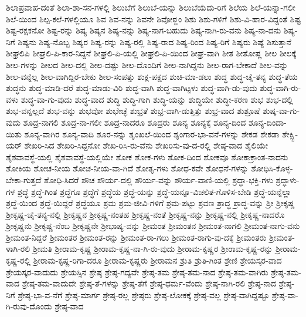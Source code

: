 {ಶಿಲಾಪ್ರವಾಹ-ದಂತೆ
ಶಿಲಾ-ಶಾ-ಸನ-ಗಳಲ್ಲಿ
ಶಿಲುಬೆಗೆ
ಶಿಲುಬೆ-ಯನ್ನು
ಶಿಲುಬೆಯೆದು-ರಿಗೆ
ಶಿಲೆಯ
ಶಿಲೆ-ಯನ್ನಾ-ಗಲೀ
ಶಿಲೆ-ಯಿಂದ
ಶಿಲ್ಪ-ಕಲೆ-ಗಳಲ್ಲಿಯೂ
ಶಿವ
ಶಿವ-ನನ್ನು
ಶಿವನೇ
ಶಿವೋಠ್ಹಂ
ಶಿಶು
ಶಿಶು-ಗಳಿಗೆ
ಶಿಶು-ವಿ-ಹಾರ-ವಿದ್ದಂತೆ
ಶಿಷ್ಟ
ಶಿಷ್ಟ-ರಕ್ಷಕನೋ
ಶಿಷ್ಟ-ರನ್ನು
ಶಿಷ್ಯ
ಶಿಷ್ಯನ
ಶಿಷ್ಯ-ನನ್ನು
ಶಿಷ್ಯ-ನಾಗ-ಬಹುದು
ಶಿಷ್ಯ-ನಾಗಿ-ರು-ವನು
ಶಿಷ್ಯ-ನಾ-ದನು
ಶಿಷ್ಯ-ನಿಗೆ
ಶಿಷ್ಯನು
ಶಿಷ್ಯ-ನೊಬ್ಬ
ಶಿಷ್ಯರ
ಶಿಷ್ಯ-ರನ್ನು
ಶಿಷ್ಯ-ರಲ್ಲಿ
ಶಿಷ್ಯ-ರಾದ
ಶಿಷ್ಯ-ರಿಂದ
ಶಿಷ್ಯ-ರಿಗೆ
ಶಿಷ್ಯರು
ಶಿಷ್ಯೆ
ಶಿಸುತ್ತಾನೆ
ಶೀಘ್ರಲಿಪಿ
ಶೀಘ್ರಲಿ-ಪಿ-ಕಾರ-ನಿದ್ದನೆ
ಶೀಘ್ರಲಿ-ಪಿ-ಯಲ್ಲಿ
ಶೀಘ್ರಲಿ-ಪಿ-ಯಿಂದ
ಶೀಘ್ರ-ವಾಗಿ
ಶೀತ
ಶೀತೋಷ್ಣ
ಶೀಲ
ಶೀಲಕ್ಕೆ
ಶೀಲ-ಗಳನ್ನು
ಶೀಲದ
ಶೀಲ-ದಲ್ಲಿ
ಶೀಲ-ದಷ್ಟು
ಶೀಲ-ದೊಂದಿಗೆ
ಶೀಲ-ನಾಗಿದ್ದನು
ಶೀಲ-ರಾಗ-ಬೇಕಾದೆ
ಶೀಲ-ವನ್ನು
ಶೀಲ-ವನ್ನೆಲ್ಲ
ಶೀಲ-ವಾಗಿದ್ದಿರ-ಬೇಕು
ಶೀಲ-ಸಂಪತ್ತು
ಶುಕ್ಲ-ಪಕ್ಷದ
ಶುಚಿ-ಮಾ-ಡಲು
ಶುದ್ಧ
ಶುದ್ಧ-ಚೈ-ತನ್ಯ
ಶುದ್ಧ-ತೆಯ
ಶುದ್ಧನು
ಶುದ್ಧ-ಮಾಡಿ-ದರೆ
ಶುದ್ಧ-ಮಾಡು-ವಿರಿ
ಶುದ್ಧ-ವಾಗಿ
ಶುದ್ಧ-ವಾಗಿಟ್ಟಳು
ಶುದ್ಧ-ವಾಗಿ-ಡು-ವುದು
ಶುದ್ಧ-ವಾಗಿ-ರು-ವಳು
ಶುದ್ಧ-ವಾ-ಗು-ವುದು
ಶುದ್ಧ-ವಾದ
ಶುದ್ಧಿ
ಶುದ್ಧಿ-ಗಾಗಿ
ಶುದ್ಧಿ-ಯನ್ನು
ಶುದ್ಧಿಯೇ
ಶುದ್ಧೀ-ಕರಣ
ಶುಭ
ಶುಭ-ದಲ್ಲಿ
ಶುಭ-ವನ್ನಲ್ಲದೆ
ಶುಭ-ವನ್ನು
ಶುಭವೋ
ಶುಭೇಚ್ಛೆ
ಶುಭ್ರತೆ
ಶುಭ್ರ-ವಾಗಿ-ಡುತ್ತಿತ್ತು
ಶುಭ್ರ-ವಾದ
ಶುಶ್ರೂಷೆ
ಶುಷ್ಕ-ವಾ-ಗು-ವುದು
ಶೂದ್ರ-ನಾಗಲಿ
ಶೂದ್ರ-ನಾ-ಗಲೀ
ಶೂದ್ರ-ನಾದರೂ
ಶೂದ್ರರು
ಶೂನ್ಯ
ಶೂನ್ಯಕ್ಕೆ
ಶೂನ್ಯ-ದಿಂದ
ಶೂನ್ಯ-ದಿಂದಾ-ಯಿತು
ಶೂನ್ಯ-ವಾಗಿರ
ಶೂನ್ಯ-ವಾದಿ
ಶೂರ-ನನ್ನು
ಶೃಂಖಲೆ-ಯಿಂದ
ಶೃಂಗಾರ-ಭಾ-ವನೆ-ಗಳನ್ನು
ಶೇಕಡ
ಶೇಕಡಾ
ಶೇಕ್ಸ್ಪಿ-ಯರ್
ಶೇಖರಿ-ಸಿದ
ಶೇಖರಿ-ಸಿದ್ದನೋ
ಶೇಖ-ರಿಸಿ-ರು-ವೆನು
ಶೇಖರಿಸು-ವು-ದ-ರಲ್ಲಿ
ಶೇಷ್ಠ-ವಾದ
ಶೈಲಿಯೇ
ಶೈಶವಾವಸ್ಥೆ-ಯಲ್ಲಿ
ಶೈಶವಾವಸ್ಥೆ-ಯಲ್ಲಿಯೇ
ಶೋಕ
ಶೋಕ-ಗಳು
ಶೋಕ-ದಿಂದ
ಶೋಕವೂ
ಶೋಕಾಕ್ರಾಂತ-ನಾದನು
ಶೋಕಿಯ
ಶೋಚ-ನೀಯ
ಶೋಚ-ನೀಯ-ವಾ-ಗಿದೆ
ಶೋತೃ-ಗಳು
ಶೋಧ-ಕವೇ
ಶೋಧನೆ-ಗಳನ್ನು
ಶೋಧಿಸಿ-ಕೊಳ್ಳ-ಬೇಕಾ-ಗುತ್ತದೆ
ಶೋಧಿ-ಸಿದರೆ
ಶೌಚ
ಶೌರ್ಯ-ದಲ್ಲಿ
ಶೌರ್ಯ-ವನ್ನು
ಶೌರ್ಯ-ವಾಣಿ-ಯಲ್ಲಿ
ಶ್ರದ್ಧಾ-ಭಕ್ತಿ-ಗಳು
ಶ್ರದ್ಧಾಳು-ಗಳ
ಶ್ರದ್ಧೆ
ಶ್ರದ್ಧೆ-ಗಿಂತ
ಶ್ರದ್ಧೆಗೂ
ಶ್ರದ್ಧೆಗೆ
ಶ್ರದ್ಧೆಯ
ಶ್ರದ್ಧೆ-ಯನ್ನು
ಶ್ರದ್ಧೆ-ಯನ್ನೂ-ವಿಚಲಿತ-ಗೊಳಿಸ-ಬೇಡಿ
ಶ್ರದ್ಧೆ-ಯನ್ನೆಲ್ಲಾ
ಶ್ರದ್ಧೆ-ಯಿಂದ
ಶ್ರದ್ಧೆ-ಯಿದ್ದರೆ
ಶ್ರದ್ಧೆಯೂ
ಶ್ರಮ
ಶ್ರಮ-ಜೀವಿ-ಗಳಿಗೆ
ಶ್ರಮ-ಪಟ್ಟು
ಶ್ರವಣ
ಶ್ರಾದ್ಧ
ಶ್ರಾದ್ಧ-ವನ್ನು
ಶ್ರೀ
ಶ್ರೀಕೃಷ್ಣ
ಶ್ರೀಕೃಷ್ಣ-ಚೈ-ತನ್ಯ-ನಲ್ಲಿ
ಶ್ರೀಕೃಷ್ಣನ
ಶ್ರೀಕೃಷ್ಣ-ನಂತಹ
ಶ್ರೀಕೃಷ್ಣ-ನಂತೆ
ಶ್ರೀಕೃಷ್ಣ-ನನ್ನು
ಶ್ರೀಕೃಷ್ಣ-ನಲ್ಲಿ
ಶ್ರೀಕೃಷ್ಣ-ನಾದರೊ
ಶ್ರೀಕೃಷ್ಣನು
ಶ್ರೀಕೃಷ್ಣ-ನೆಂಬ
ಶ್ರೀಕೃಷ್ಣನೇ
ಶ್ರೀಭಾಷ್ಯ-ವನ್ನು
ಶ್ರೀಮಂತ
ಶ್ರೀಮಂತನ
ಶ್ರೀಮಂತ-ನಾಗಲಿ
ಶ್ರೀಮಂತ-ನಾಗು-ವನು
ಶ್ರೀಮಂತ-ನಿದ್ದರೆ
ಶ್ರೀಮಂತರ
ಶ್ರೀಮಂತ-ರನ್ನು
ಶ್ರೀಮಂತ-ರಾ-ಗಲು
ಶ್ರೀಮಂತ-ರಾಗು-ವು-ದಕ್ಕೆ
ಶ್ರೀಮಂತರು
ಶ್ರೀಮಂತ-ಳಾಗಿ-ರಲಿ
ಶ್ರೀಮತಿ
ಶ್ರೀರಾಮ-ಕೃಷ್ಣ
ಶ್ರೀರಾಮ-ಕೃಷ್ಣ-ನಾ-ಗಿ-ರು-ವುದು
ಶ್ರೀರಾಮ-ಕೃಷ್ಣರ
ಶ್ರೀರಾಮ-ಕೃಷ್ಣ-ರನ್ನು
ಶ್ರೀರಾಮ-ಕೃಷ್ಣ-ರಲ್ಲಿ
ಶ್ರೀರಾಮ-ಕೃಷ್ಣ-ರಿಗಾ-ದರೂ
ಶ್ರೀರಾಮ-ಕೃಷ್ಣರು
ಶ್ರೀರಾಮನ
ಶ್ರುತಿ
ಶ್ರುತಿ-ಗಿಂತ
ಶ್ರೇಣಿ
ಶ್ರೇಯಸ್ಕರ-ವಾದ
ಶ್ರೇಯಸ್ಕರ-ವಾದುದು
ಶ್ರೇಯಸ್ಸಿನ
ಶ್ರೇಷ್ಠ
ಶ್ರೇಷ್ಠ-ಗದ್ಯವೇ
ಶ್ರೇಷ್ಠ-ತಮ
ಶ್ರೇಷ್ಠ-ತಮ-ನಾದ
ಶ್ರೇಷ್ಠ-ತಮ-ವಾಗಿರು
ಶ್ರೇಷ್ಠ-ತಮ-ವಾದ
ಶ್ರೇಷ್ಠ-ತಮ-ವಾದುದೇ
ಶ್ರೇಷ್ಠ-ತೆ-ಗಳನ್ನು
ಶ್ರೇಷ್ಠ-ತೆಗೆ
ಶ್ರೇಷ್ಠ-ಧರ್ಮ-ವೆಂದು
ಶ್ರೇಷ್ಠ-ನಾಗಿ-ರಲಿ
ಶ್ರೇಷ್ಠ-ನಾದ
ಶ್ರೇಷ್ಠ-ನಿಗೆ
ಶ್ರೇಷ್ಠ-ಭಾ-ವ-ನೆಗೆ
ಶ್ರೇಷ್ಠ-ಮಾರ್ಗ
ಶ್ರೇಷ್ಠ-ರಲ್ಲ
ಶ್ರೇಷ್ಠರು
ಶ್ರೇಷ್ಠ-ಲೋಕಕ್ಕೆ
ಶ್ರೇಷ್ಠ-ವಲ್ಲ
ಶ್ರೇಷ್ಠ-ವಾಗಿದ್ದಷ್ಟೂ
ಶ್ರೇಷ್ಠ-ವಾ-ಗಿ-ರುವು-ದೊಂದು
ಶ್ರೇಷ್ಠ-ವಾದ
}
